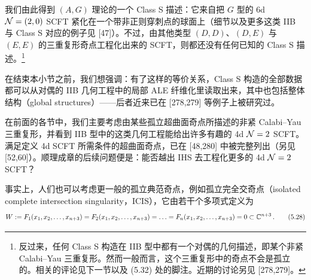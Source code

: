 
我们由此得到 $(A,G)$ 理论的一个 Class S 描述：它来自把 $G$ 型的 6d $\mathcal{N}=(2,0)$ SCFT 紧化在一个带非正则穿刺点的球面上（细节以及更多这类 IIB 与 Class S 对应的例子见 [47]）。不过，由其他类型 $(D,D)$、$(D,E)$ 与 $(E,E)$ 的三重复形奇点工程化出来的 SCFT，则都还没有任何已知的 Class S 描述。\footnote{反过来，任何 Class S 构造在 IIB 型中都有一个对偶的几何描述，即某个非紧 Calabi--Yau 三重复形。然而一般而言，这个三重复形中的奇点不会是孤立的。相关的评论见下一节以及 (5.32) 处的脚注。近期的讨论另见 [278,279]。}


在结束本小节之前，我们想强调：有了这样的等价关系，Class S 构造的全部数据都可以从对偶的 IIB 几何工程中的局部 ALE 纤维化里读取出来，其中也包括整体结构（global structures）——后者近来已在 [278,279] 等例子上被研究过。



在前面的各节中，我们主要考虑由某些孤立超曲面奇点所描述的非紧 Calabi--Yau 三重复形，并看到 IIB 型中的这类几何工程能给出许多有趣的 4d $\mathcal{N}=2$ SCFT。满足定义 4d SCFT 所需条件的超曲面奇点，已在 [48,280] 中被完整列出（另见 [52,60]）。顺理成章的后续问题便是：能否越出 IHS 去工程化更多的 4d $\mathcal{N}=2$ SCFT？


事实上，人们也可以考虑更一般的孤立典范奇点，例如孤立完全交奇点（isolated complete intersection singularity，ICIS），它由若干个多项式定义为
\begin{equation}
W := F_1(x_1,x_2,\ldots,x_{n+3}) = F_2(x_1,x_2,\ldots,x_{n+3}) = \ldots = F_n(x_1,x_2,\ldots,x_{n+3}) = 0 \subset \mathbb{C}^{n+3}\,.
\tag{5.28}
\end{equation}

